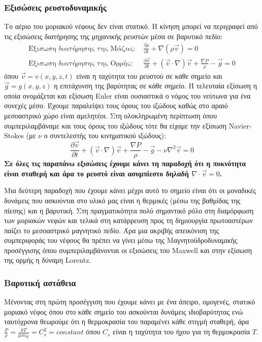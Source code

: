 \documentclass[a4paper,11pt]{memoir}
\newcommand{\pt}[1]{\frac{\partial #1}{\partial t}}
\newcommand{\vv}{\vec{v}}
\begin{document}
\subsubsection{Εξισώσεις ρευστοδυναμικής}
Το αέριο του μοριακού νέφους δεν είναι στατικό. Η κίνηση μπορεί να περιγραφεί από τις εξισώσεις διατήρησης της μηχανικής ρευστών μέσα σε βαρυτικό πεδίο:
\begin{align}
\text{Εξισωση διατήρησης της Μάζας:  } &\pt{\rho} + \nabla (\rho \vv)=0 \\
\text{Εξισωση διατήρησης της Ορμής:  } &\pt{\vv} +(\vv \cdot \nabla) \vv +\frac{\nabla P}{\rho} -\vec{g}=0
\label{eq:euler}
\end{align}
όπου $\vv=v(x,y,z,t)$ είναι η ταχύτητα του ρευστού σε κάθε σημείο και $\vec{g}=g(x,y,z)$ η επιτάχυνση της βαρύτητας σε κάθε σημείο.
Η τελευταία εξίσωση η οποία ονομάζεται και εξίσωση Euler είναι ουσιαστικά ο νόμος του νεύτωνα για ένα συνεχές μέσο.
Έχουμε παραλείψει τους όρους του ιξώδους καθώς στο αραιό μεσοαστρικό χώρο είναι αμελητέοι. Στη ολοκληρωμένη περίπτωση όπου συμπεριλαμβάναμε και τους όρους του ιξώδους τότε θα είχαμε την εξίσωση Navier-Stokes (με $\nu$ ο συντελεστής του κινηματικού ιξώδους): 
$$
\pt{\vv} +(\vv \cdot \nabla) \vv +\frac{\nabla P}{\rho} -\vec{g}-\nu \nabla ^2 \vv=0
$$
\textbf{Σε όλες τις παραπάνω εξισώσεις έχουμε κάνει τη παραδοχή ότι η πυκνότητα είναι σταθερή και άρα το ρευστό είναι ασυμπίεστο δηλαδή $\nabla \cdot \vv = 0$.}

Μια δεύτερη παραδοχή που έχουμε κάνει μέχρι αυτό το σημείο είναι ότι οι μοναδικές δυνάμεις που ασκούνται στο υλικό μας είναι η θερμικές (μέσω της βαθμίδας της πίεσης) και η βαρυτική. Στη πραγματικότητα πολύ σημαντικό ρόλο στη διαμόρφωση των μοριακών νεφών και τελικά στη κατάρρευση προς τη δημιουργία πρωτοαστέρων παίζει το μεσοαστρικό μαγνητικό πεδίο. Άρα μια ακριβής απεικόνιση της συμπεριφοράς του νέφους θα πρέπει να γίνει μέσω της Μαγνητοϋδροδυναμικής προσέγγισης όπου συμπεριλαμβάνονται οι εξισώσεις του Maxwell και στην εξίσωση της ορμής η δύναμη Lorentz.    

\subsubsection{Βαρυτική αστάθεια}
Μένοντας στη πρώτη προσέγγιση που έχουμε κάνει με ένα άπειρο, ομογενές, στατικό μοριακό νέφος όπου στο κάθε σημείο του ασκούνται δυνάμεις ιδιοβαρύτητας ενώ ταυτόχρονα θεωρούμε ότι η θερμοκρασία του παραμένει κάθε στιγμή σταθερή, άρα $\frac{P}{\rho}=\frac{kT}{\mu m_{H}}=C_{s}^2=constant$ όπου $C_{s}$ είναι η ταχύτητα του ήχου για τη θερμοκρασία $T$.
\end{document}
